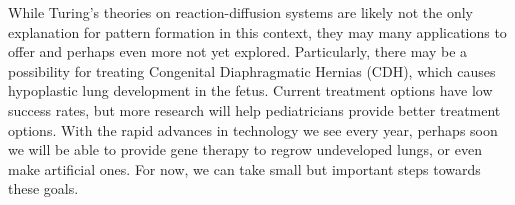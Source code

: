 \documentclass[12pt]{article}
\begin{document}
While Turing's theories on reaction-diffusion systems are likely not the only explanation for pattern formation in this context, they may many applications to offer and perhaps even more not yet explored. Particularly, there may be a possibility for treating Congenital Diaphragmatic Hernias (CDH), which causes hypoplastic lung development in the fetus. Current treatment options have low success rates, but more research will help pediatricians provide better treatment options. With the rapid advances in technology we see every year, perhaps soon we will be able to provide gene therapy to regrow undeveloped lungs, or even make artificial ones. For now, we can take small but important steps towards these goals.


\pagebreak



\end{document}

